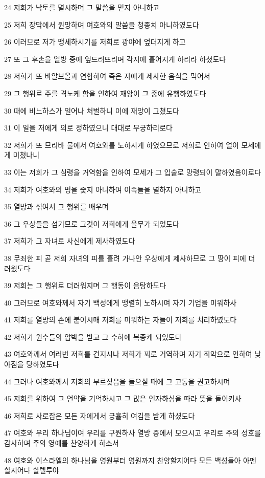 \par 24 저희가 낙토를 멸시하며 그 말씀을 믿지 아니하고
\par 25 저희 장막에서 원망하며 여호와의 말씀을 청종치 아니하였도다
\par 26 이러므로 저가 맹세하시기를 저희로 광야에 엎더지게 하고
\par 27 또 그 후손을 열방 중에 엎드러뜨리며 각지에 흩어지게 하리라 하셨도다
\par 28 저희가 또 바알브올과 연합하여 죽은 자에게 제사한 음식을 먹어서
\par 29 그 행위로 주를 격노케 함을 인하여 재앙이 그 중에 유행하였도다
\par 30 때에 비느하스가 일어나 처벌하니 이에 재앙이 그쳤도다
\par 31 이 일을 저에게 의로 정하였으니 대대로 무궁하리로다
\par 32 저희가 또 므리바 물에서 여호와를 노하시게 하였으므로 저희로 인하여 얼이 모세에게 미쳤나니
\par 33 이는 저희가 그 심령을 거역함을 인하여 모세가 그 입술로 망령되이 말하였음이로다
\par 34 저희가 여호와의 명을 좇지 아니하여 이족들을 멸하지 아니하고
\par 35 열방과 섞여서 그 행위를 배우며
\par 36 그 우상들을 섬기므로 그것이 저희에게 올무가 되었도다
\par 37 저희가 그 자녀로 사신에게 제사하였도다
\par 38 무죄한 피 곧 저희 자녀의 피를 흘려 가나안 우상에게 제사하므로 그 땅이 피에 더러웠도다
\par 39 저희는 그 행위로 더러워지며 그 행동이 음탕하도다
\par 40 그러므로 여호와께서 자기 백성에게 맹렬히 노하시며 자기 기업을 미워하사
\par 41 저희를 열방의 손에 붙이시매 저희를 미워하는 자들이 저희를 치리하였도다
\par 42 저희가 원수들의 압박을 받고 그 수하에 복종케 되었도다
\par 43 여호와께서 여러번 저희를 건지시나 저희가 꾀로 거역하며 자기 죄악으로 인하여 낮아짐을 당하였도다
\par 44 그러나 여호와께서 저희의 부르짖음을 들으실 때에 그 고통을 권고하시며
\par 45 저희를 위하여 그 언약을 기억하시고 그 많은 인자하심을 따라 뜻을 돌이키사
\par 46 저희로 사로잡은 모든 자에게서 긍휼히 여김을 받게 하셨도다
\par 47 여호와 우리 하나님이여 우리를 구원하사 열방 중에서 모으시고 우리로 주의 성호를 감사하며 주의 영예를 찬양하게 하소서
\par 48 여호와 이스라엘의 하나님을 영원부터 영원까지 찬양할지어다 모든 백성들아 아멘 할지어다 할렐루야

